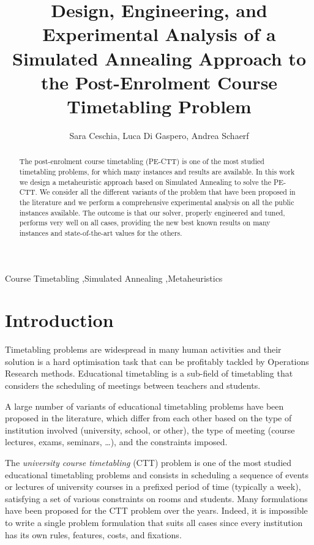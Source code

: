 \documentclass[authoryear,preprint,a4paper,12pt]{elsarticle}
\begin{document}
\begin{frontmatter}
   \title{Design, Engineering, and Experimental Analysis of a Simulated Annealing
     Approach to the Post-Enrolment Course Timetabling Problem}
  \author{Sara Ceschia, Luca Di Gaspero, Andrea Schaerf}
  \address{DIEGM, University of Udine\\
    via delle Scienze 208, I-33100, Udine, Italy}

  \begin{abstract}
The post-enrolment course timetabling (PE-CTT) is one of the most studied timetabling problems, for which many instances and results are available. In this work we design a metaheuristic approach based on Simulated Annealing to solve the PE-CTT. We consider all the different variants of the problem that have been proposed in the literature and we perform a comprehensive experimental analysis on all the public instances available. The outcome is that our solver, properly engineered and tuned, performs very well on all cases, providing the new best known results on many instances and state-of-the-art values for the others.
  \end{abstract}

  \begin{keyword}

    Course Timetabling \sep Simulated Annealing \sep Metaheuristics

  \end{keyword}

\end{frontmatter}

\section{Introduction}

Timetabling problems are widespread in many human activities and their
solution is a hard optimisation task that can be profitably tackled by
Operations Research methods. Educational timetabling is a sub-field of timetabling that
considers the scheduling of meetings between teachers and students.

A large number of variants of educational timetabling problems
have been proposed in the literature, which differ from each other
based on the type of institution involved (university, school, or
other), the type of meeting (course lectures, exams, seminars, \dots),
and the constraints imposed.

The \emph{university course timetabling} (CTT) problem is one of the
most studied educational timetabling problems and consists in
scheduling a sequence of events or lectures of university courses in a prefixed
period of time (typically a week), satisfying a set of various
constraints on rooms and students. Many formulations have been
proposed for the CTT problem over the years. Indeed, it is
impossible to write a single problem formulation that suits all cases
since every institution has its own rules, features, costs, and 
fixations.
\end{document}
